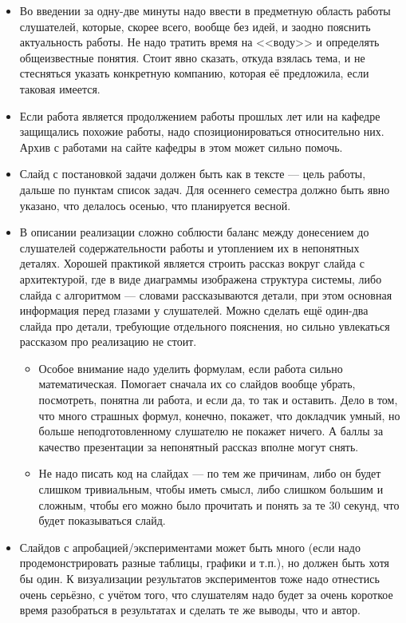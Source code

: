 \documentclass{article}
\begin{document}
\begin{itemize}
    \item Во введении за одну-две минуты надо ввести в предметную область работы слушателей, которые, скорее всего, вообще без идей, и заодно пояснить актуальность работы. Не надо тратить время на <<воду>> и определять общеизвестные понятия. Стоит явно сказать, откуда взялась тема, и не стесняться указать конкретную компанию, которая её предложила, если таковая имеется.
    \item Если работа является продолжением работы прошлых лет или на кафедре защищались похожие работы, надо спозиционироваться относительно них. Архив с работами на сайте кафедры в этом может сильно помочь.
    \item Слайд с постановкой задачи должен быть как в тексте --- цель работы, дальше по пунктам список задач. Для осеннего семестра должно быть явно указано, что делалось осенью, что планируется весной.
    \item В описании реализации сложно соблюсти баланс между донесением до слушателей содержательности работы и утоплением их в непонятных деталях. Хорошей практикой является строить рассказ вокруг слайда с архитектурой, где в виде диаграммы изображена структура системы, либо слайда с алгоритмом --- словами рассказываются детали, при этом основная информация перед глазами у слушателей. Можно сделать ещё один-два слайда про детали, требующие отдельного пояснения, но сильно увлекаться рассказом про реализацию не стоит.
    \begin{itemize}
        \item Особое внимание надо уделить формулам, если работа сильно математическая. Помогает сначала их со слайдов вообще убрать, посмотреть, понятна ли работа, и если да, то так и оставить. Дело в том, что много страшных формул, конечно, покажет, что докладчик умный, но больше неподготовленному слушателю не покажет ничего. А баллы за качество презентации за непонятный рассказ вполне могут снять.
        \item Не надо писать код на слайдах --- по тем же причинам, либо он будет слишком тривиальным, чтобы иметь смысл, либо слишком большим и сложным, чтобы его можно было прочитать и понять за те 30 секунд, что будет показываться слайд.
    \end{itemize}
    \item Слайдов с апробацией/экспериментами может быть много (если надо продемонстрировать разные таблицы, графики и т.п.), но должен быть хотя бы один. К визуализации результатов экспериментов тоже надо отнестись очень серьёзно, с учётом того, что слушателям надо будет за очень короткое время разобраться в результатах и сделать те же выводы, что и автор.

\end{itemize}
\end{document}
